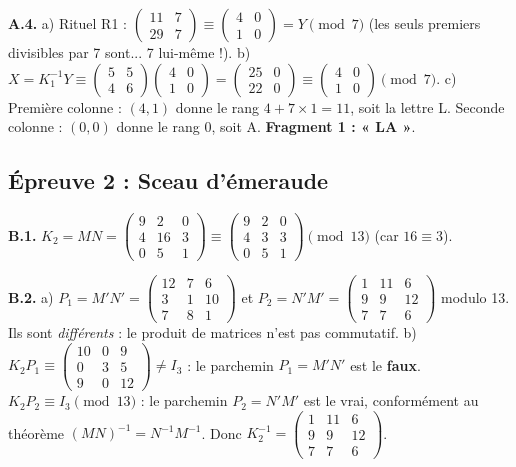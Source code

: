 \documentclass[11pt,a4paper]{article}
\begin{document}
\textbf{A.4.} a) Rituel R1 :
$\begin{pmatrix}11&7\\29&7\end{pmatrix}
\equiv \begin{pmatrix}4&0\\1&0\end{pmatrix} = Y \pmod 7$
(les seuls premiers divisibles par 7 sont... 7 lui-même !).
b) $X = K_1^{-1} Y \equiv \begin{pmatrix}5&5\\4&6\end{pmatrix}
\begin{pmatrix}4&0\\1&0\end{pmatrix}
= \begin{pmatrix}25&0\\22&0\end{pmatrix}
\equiv \begin{pmatrix}4&0\\1&0\end{pmatrix} \pmod 7$.
c) Première colonne : $(4,1)$ donne le rang $4 + 7\times 1 = 11$,
soit la lettre L. Seconde colonne : $(0,0)$ donne le rang $0$, soit A.
\textbf{Fragment 1 : « LA »}.

\subsection*{Épreuve 2 : Sceau d'émeraude}
\textbf{B.1.} $K_2 = MN = \begin{pmatrix}9&2&0\\4&16&3\\0&5&1\end{pmatrix}
\equiv \begin{pmatrix}9&2&0\\4&3&3\\0&5&1\end{pmatrix} \pmod{13}$
(car $16 \equiv 3$).

\textbf{B.2.} a) $P_1 = M'N' = \begin{pmatrix}12&7&6\\3&1&10\\7&8&1\end{pmatrix}$
et $P_2 = N'M' = \begin{pmatrix}1&11&6\\9&9&12\\7&7&6\end{pmatrix}$
modulo 13. Ils sont \emph{différents} : le produit de matrices n'est pas
commutatif.
b) $K_2 P_1 \equiv \begin{pmatrix}10&0&9\\0&3&5\\9&0&12\end{pmatrix}
\neq I_3$ : le parchemin $P_1 = M'N'$ est le \textbf{faux}.
$K_2 P_2 \equiv I_3 \pmod{13}$ : le parchemin $P_2 = N'M'$ est le vrai,
conformément au théorème $(MN)^{-1} = N^{-1}M^{-1}$.
Donc $K_2^{-1} = \begin{pmatrix}1&11&6\\9&9&12\\7&7&6\end{pmatrix}$.
\end{document}

